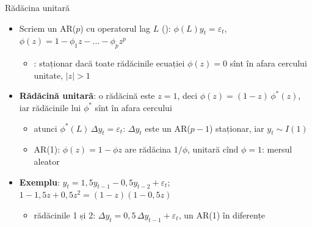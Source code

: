 \begin{frame}{Rădăcina unitară}
\itemsize{\small}
\begin{itemize}
    \item Scriem un AR($p$) cu operatorul lag $L$ (): $\phi(L)y_t = \varepsilon_t$, $\phi(z) = 1 - \phi_1 z - \dots - \phi_p z^p$
    \begin{itemize}
        \item {}: staționar dacă toate rădăcinile ecuației $\phi(z) = 0$ sînt în afara cercului unitate, $|z| > 1$
    \end{itemize}
    \item \textbf{Rădăcină unitară}: o rădăcină este $z = 1$, deci $\phi(z) = (1 - z)\,\phi^*(z)$, iar rădăcinile lui $\phi^*$ sînt în afara cercului
    \begin{itemize}
        \item atunci $\phi^*(L)\,\Delta y_t = \varepsilon_t$: $\Delta y_t$ este un AR($p-1$) staționar, iar $y_t \sim I(1)$
        \item AR(1): $\phi(z) = 1 - \phi z$ are rădăcina $1/\phi$, unitară cînd $\phi = 1$: mersul aleator
    \end{itemize}
    \item \textbf{Exemplu}: $y_t = 1{,}5y_{t-1} - 0{,}5y_{t-2} + \varepsilon_t$; $1 - 1{,}5z + 0{,}5z^2 = (1 - z)(1 - 0{,}5z)$
    \begin{itemize}
        \item rădăcinile 1 și 2: $\Delta y_t = 0{,}5\,\Delta y_{t-1} + \varepsilon_t$, un AR(1) în diferențe
    \end{itemize}
\end{itemize}
\end{frame}

